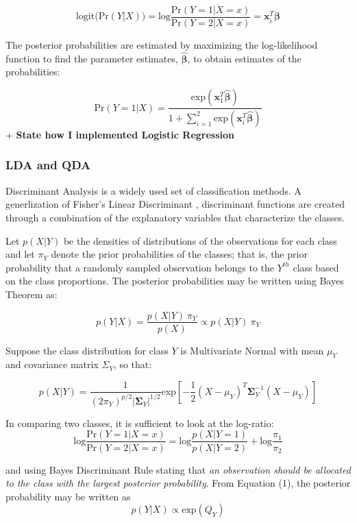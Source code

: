 \documentclass[12pt,]{article}
\begin{document}
\[
\text{logit} \Big( \text{Pr}(Y \vert X) \Big) = \text{log} \frac{ \text{Pr}(Y=1 \vert X=x) }{ \text{Pr}(Y=2 \vert X=x) }  = \mathbf{x}^T_i\boldsymbol{\beta}  
\]

The posterior probabilities are estimated by maximizing the
log-likelihood function to find the parameter estimates,
\(\hat{\boldsymbol{\beta}}\), to obtain estimates of the probabilities:

\[
\text{Pr}(Y=1 \vert X) = \frac{ \text{exp}(\mathbf{x}^T_1 \hat{\boldsymbol{\beta}}) }{ 1 + \sum^2_{i=1} \text{exp}(\mathbf{x}^T_i \hat{\boldsymbol{\beta}}) }
\] + \textbf{State how I implemented Logistic Regression}

\subsubsection{LDA and QDA}\label{lda-and-qda}

Discriminant Analysis is a widely used set of classification methods. A
generlization of Fisher's Linear Discriminant \citep{fisher_use_1936},
discriminant functions are created through a combination of the
explanatory variables that characterize the classes.

Let \(p(X \vert Y)\) be the densities of distributions of the
observations for each class and let \(\pi_Y\) denote the prior
probabilities of the classes; that is, the prior probability that a
randomly sampled observation belongs to the \(Y^{th}\) class based on
the class proportions. The posterior probabilities may be written using
Bayes Theorem as:

\[
p(Y \vert X) = \frac{p(X \vert Y) ~\pi_Y}{p(X)} \propto p(X \vert Y) ~\pi_Y   \tag{1}
\]

Suppose the class distribution for class \(Y\) is Multivariate Normal
with mean \(\mu_Y\) and covariance matrix \(\Sigma_Y\), so that:

\[
p(X \vert Y) = \frac{1}{(2 \pi_Y)^{p/2} \vert\boldsymbol{\Sigma}_Y\vert ^{1/2}} \text{exp} \left[-\frac{1}{2}(X - \mu_Y)^T \boldsymbol{\Sigma}^{-1}_Y(X - \mu_Y)  \right]  \tag{2}
\]

In comparing two classes, it is sufficient to look at the log-ratio: \[
\text{log} \frac{\text{Pr}(Y=1 \vert X=x)}{\text{Pr}(Y=2 \vert X=x)} = \text{log}\frac{p(X \vert Y=1)}{p(X \vert Y=2)} + \text{log}\frac{\pi_1}{\pi_2}   \tag{3}
\]

and using Bayes Discriminant Rule stating that \emph{an observation
should be allocated to the class with the largest posterior
probability}. From Equation (1), the posterior probability may be
written as \[
p(Y \vert X) \propto \text{exp} \left( Q_Y \right)    \tag{4}
\]
\end{document}
